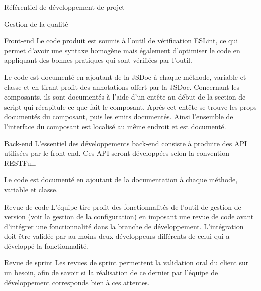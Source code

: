 \documentclass[]{article}
\begin{document}
{\begin{section}{\label{sec:Référentiel de développement de projet}Référentiel de développement de projet}
     \begin{subsection}{\label{sec:Gestion de la qualité}Gestion de la qualité}
         \begin{subsubsection}{\label{sec:Front-end}Front-end}
             Le code produit est soumis à l’outil de vérification ESLint, ce qui permet d’avoir une syntaxe homogène mais également d’optimiser le code en appliquant des bonnes pratiques qui sont vérifiées par l’outil.

             Le code est documenté en ajoutant de la JSDoc à chaque méthode, variable et classe et en tirant profit des annotations offert par la JSDoc. Concernant les composants, ils sont documentés à l’aide d’un entête au début de la section de script qui récapitule ce que fait le composant. Après cet entête se trouve les props documentés du composant, puis les emits documentés. Ainsi l’ensemble de l’interface du composant est localisé au même endroit et est documenté.
         \end{subsubsection}

         \begin{subsubsection}{\label{sec:Back-end}Back-end}
             L’essentiel des développements back-end consiste à produire des API utilisées par le front-end. Ces API seront développées selon la convention RESTFull.

             Le code est documenté en ajoutant de la documentation à chaque méthode, variable et classe.
         \end{subsubsection}

         \begin{subsubsection}{\label{sec:Revue de code}Revue de code}
             L’équipe tire profit des fonctionnalités de l’outil de gestion de version (voir la \hyperref[sec:Gestion de la configuration]{gestion de la configuration}) en imposant une revue de code avant d’intégrer une fonctionnalité dans la branche de développement. L’intégration doit être validée par au moins deux développeurs différents de celui qui a développé la fonctionnalité.
         \end{subsubsection}

         \begin{subsubsection}{\label{sec:Revue de sprint}Revue de sprint}
             Les revues de sprint permettent la validation oral du client sur un besoin, afin de savoir si la réalisation de ce dernier par l’équipe de développement corresponds bien à ces attentes.
         \end{subsubsection}
     \end{subsection}
    \end{section}

}
\end{document}
